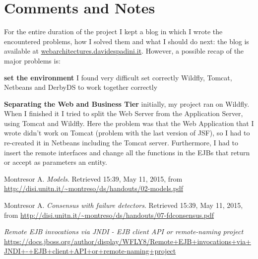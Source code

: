 \documentclass[a4paper]{article}
\begin{document}
\section{Comments and Notes}
\label{sec:conc}
For the entire duration of the project I kept a blog in which I wrote the encountered problems, how I solved them and what I should do next: the blog is available at \url{webarchitectures.davidespadini.it}. However, a possible recap of the major problems is:
\begin{compactitem}
  \item \textbf{set the environment} I found very difficult set correctly Wildfly, Tomcat, Netbeans and DerbyDS to work together correctly
  \item \textbf{Separating the Web and Business Tier} initially, my project ran on Wildfly. When I finished it I tried to split the Web Server from the Application Server, using Tomcat and Wildfly. Here the problem was that the Web Application that I wrote didn't work on Tomcat (problem with the last version of JSF), so I had to re-created it in Netbeans including the Tomcat server. Furthermore, I had to insert the remote interfaces and change all the functions in the EJBs that return or accept as parameters an entity.
\end{compactitem}
\noindent




\begin{thebibliography}{5}

 Montresor A.
\textit{Models}. Retrieved 15:39, May 11, 2015, from
\url{http://disi.unitn.it/~montreso/ds/handouts/02-models.pdf}


 Montresor A.
\textit{Consensus with failure detectors}. Retrieved 15:39, May 11, 2015, from
\url{http://disi.unitn.it/~montreso/ds/handouts/07-fdconsensus.pdf}

\textit{Remote EJB invocations via JNDI - EJB client API or remote-naming project}
\url{https://docs.jboss.org/author/display/WFLY8/Remote+EJB+invocations+via+JNDI+-+EJB+client+API+or+remote-naming+project}

\end{thebibliography}
\end{document}

